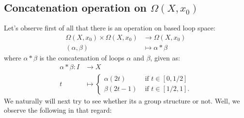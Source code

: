\documentclass[letterpaper,11pt,twoside]{article}
\theoremstyle{definition}
\theoremstyle{definition}
\theoremstyle{definition}
\theoremstyle{definition}
\theoremstyle{definition}
\theoremstyle{definition}
\theoremstyle{remark}
\theoremstyle{definition}
\newcommand{\loops}[1]{\Omega\left(#1\right)}
\begin{document}
	\subsection{Concatenation operation on $\loops{X,x_0}$}
	Let's observe first of all that there is an operation on based loop space:
	\begin{align*}
	    \loops{X,x_0} \times \loops{X,x_0} &\longrightarrow \loops{X,x_0}\\
	    (\alpha,\beta) &\longmapsto \alpha * \beta
	\end{align*}
	where $\alpha * \beta$ is the concatenation of loops $\alpha$ and $\beta$, given as:
	\begin{align*}
	    \alpha *\beta : I &\longrightarrow X\\
	    t&\longmapsto \begin{cases}
	            \alpha(2t) &\text{ if }t\in [0,1/2]\\
	            \beta(2t-1) &\text{ if } t\in [1/2,1].
	    \end{cases}
	\end{align*}
	We naturally will next try to see whether its a group structure or not. Well, we observe the following in that regard:
\end{document}
